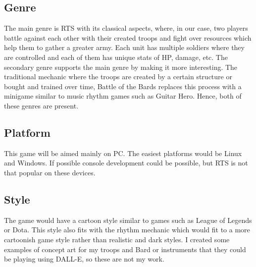 \documentclass[a4paper,10pt,english]{article}
\begin{document}
\subsection*{Genre}

The main genre is RTS with its classical aspects, where, in our case, two players battle against each other with their created troops and fight over resources which help them to gather a greater army. Each unit has multiple soldiers where they are controlled and each of them has unique stats of HP, damage, etc. The secondary genre supports the main genre by making it more interesting. The traditional mechanic where the troops are created by a certain structure or bought and trained over time, Battle of the Bards replaces this process with a minigame similar to music rhythm games such as Guitar Hero. Hence, both of these genres are present. 

\subsection*{Platform}
This game will be aimed mainly on PC. The easiest platforms would be Linux and Windows. If possible console development could be possible, but RTS is not that popular on these devices. 
  

\subsection*{Style}

The game would have a cartoon style similar to games such as League of Legends or Dota. This style also fits with the rhythm mechanic which would fit to a more cartoonish game style rather than realistic and dark styles. I created some examples of concept art for my troops and Bard or instruments that they could be playing using DALL-E, so these are not my work. 
\end{document}
